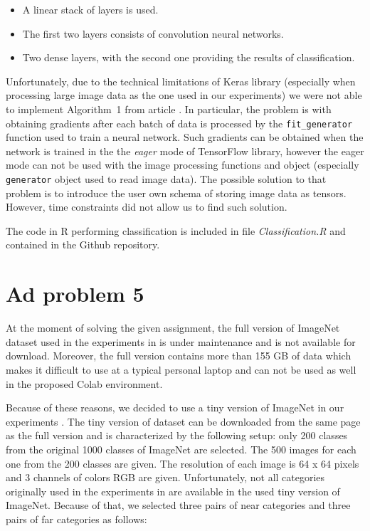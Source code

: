 \documentclass{article} %
\begin{document}
\begin{itemize}
	\item A linear stack of layers is used.
	\item The first two layers consists of convolution neural networks.
	\item Two dense layers, with the second one providing the results of classification.
\end{itemize}

Unfortunately, due to the technical limitations of Keras library (especially when processing large image data as the one used in our experiments) we were not able to implement Algorithm~1 from article \cite{du2018adapting}. In particular, the problem is with obtaining gradients after each batch of data is processed by the \texttt{fit\_generator} function used to train a neural network. Such gradients can be obtained when the network is trained in the the \textit{eager} mode of TensorFlow library, however the eager mode can not be used with the image processing functions and object (especially \texttt{generator} object used to read image data). The possible solution to that problem is to introduce the user own schema of storing image data as tensors. However, time constraints did not allow us to find such solution.

The code in R performing classification is included in file \textit{Classification.R} and contained in the Github repository.

\section{Ad problem 5}

At the moment of solving the given assignment, the full version of ImageNet dataset used in the experiments in \citep{du2018adapting} is under maintenance and is not available for download. Moreover, the full version contains more than 155 GB of data which makes it difficult to use at a typical personal laptop and can not be used as well in the proposed Colab environment. 

Because of these reasons, we decided to use a tiny version of ImageNet in our experiments \citep{ImageNet}. The tiny version of dataset can be downloaded from the same page as the full version and is characterized by the following setup: only 200 classes from the original 1000 classes of ImageNet are selected. The 500 images for each one from the 200 classes are given. The resolution of each image is 64 x 64 pixels and 3 channels of colors RGB are given. Unfortunately, not all categories originally used in the experiments in \cite{du2018adapting} are available in the used tiny version of ImageNet. Because of that, we selected three pairs of near categories and three pairs of far categories as follows:
\end{document}

